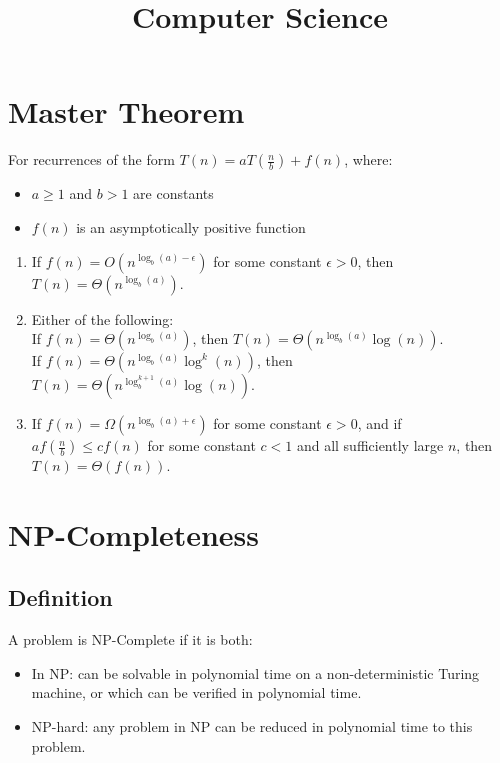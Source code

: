 \documentclass[a4paper, 12pt]{article}
\title{Computer Science}
\date{}
\begin{document}
\maketitle

\tableofcontents




\section{Master Theorem}

\noindent For recurrences of the form $T(n) = aT(\frac{n}{b}) + f(n)$, where:
\begin{itemize}
  \item $a\ge 1$ and $b>1$ are constants
  \item $f(n)$ is an asymptotically positive function
\end{itemize}
\begin{enumerate}
  \item If $f(n) = O(n^{\log_b(a)-\epsilon})$ for some constant $\epsilon >0$, then $T(n) = \Theta(n^{\log_b(a)})$.
  \item Either of the following:\\
    If $f(n) = \Theta(n^{\log_b(a)})$, then $T(n) = \Theta(n^{\log_b(a)}\log(n))$.\\
    If $f(n) = \Theta(n^{\log_b(a)}\log^k(n))$, then $T(n) = \Theta(n^{\log_b^{k+1}(a)}\log(n))$.
  \item If $f(n) = \Omega(n^{\log_b(a)+\epsilon})$ for some constant $\epsilon >0$, and if $af(\frac{n}{b})\le cf(n)$ for some constant $c<1$ and all sufficiently large $n$, then $T(n) = \Theta(f(n))$.
\end{enumerate}

\section{NP-Completeness}

  \subsection{Definition}

A problem is NP-Complete if it is both:
\begin{itemize}
  \item In NP: can be solvable in polynomial time on a non-deterministic Turing machine, or which can be verified in polynomial time.
  \item NP-hard: any problem in NP can be reduced in polynomial time to this problem.
\end{itemize}
\end{document}

